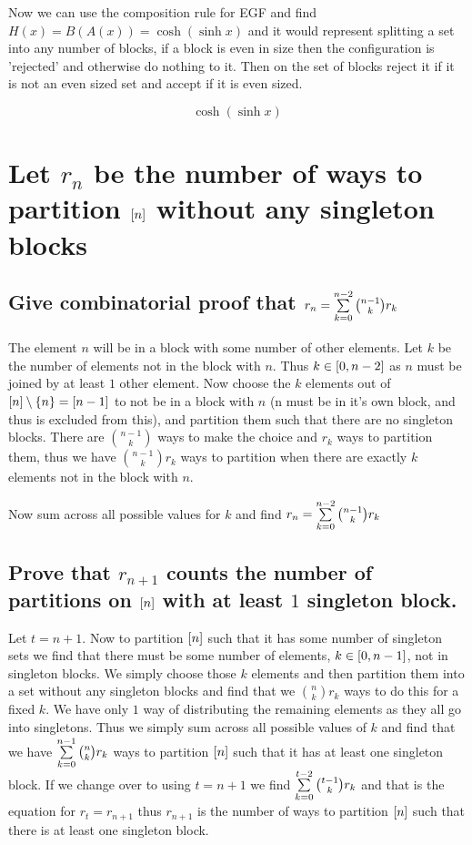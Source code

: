 \documentclass{article}
\theoremstyle{definition}
\begin{document}
Now we can use the composition rule for EGF and find $H(x) = B(A(x)) = \cosh(\sinh x)$ and it would represent splitting a set into any number of blocks, if a block is even in size then the configuration is 'rejected' and otherwise do nothing to it. Then on the set of blocks reject it if it is not an even sized set and accept if it is even sized.

\[\cosh(\sinh x)\]

\section{Let $r_n$ be the number of ways to partition $\left[ n \right]$ without any singleton blocks}
\subsection{Give combinatorial proof that $r_n=\sum\limits_{k=0}^{n-2}  {\binom{n-1}kr_k} $}

The element $n$ will be in a block with some number of other elements. Let $k$ be the number of elements not in the block with $n$. Thus $k\in\left[ {0} , {n-2} \right]$ as $n$ must be joined by at least $1$ other element. Now choose the $k$ elements out of $\left[ n \right]\setminus \left\{ {n} \right\} = \left[ n-1 \right]$ to not be in a block with $n$ (n must be in it's own block, and thus is excluded from this), and partition them such that there are no singleton blocks. There are $\binom{n-1}k$ ways to make the choice and $r_k$ ways to partition them, thus we have $\binom{n-1}kr_k$ ways to partition when there are exactly $k$ elements not in the block with $n$.

Now sum across all possible values for $k$ and find $r_n=\sum\limits_{k=0}^{n-2}  {\binom{n-1}{k}r_k} $

\subsection{Prove that $r_{n+1}$ counts the number of partitions on $\left[ n \right]$ with at least $1$ singleton block.}
Let $t=n+1$. Now to partition $\left[ n \right]$ such that it has some number of singleton sets we find that there must be some number of elements, $k \in \left[ {0} , {n-1} \right]$, not in singleton blocks. We simply choose those $k$ elements and then partition them into a set without any singleton blocks and find that we $\binom nkr_k$ ways to do this for a fixed $k$. We have only $1$ way of distributing the remaining elements as they all go into singletons. Thus we simply sum across all possible values of $k$ and find that we have $\sum\limits_{k=0}^{n-1}  {\binom nk r_k} $ ways to partition $\left[ n \right]$ such that it has at least one singleton block. If we change over to using $t=n+1$ we find $\sum\limits_{k=0}^{t-2}  {\binom {t-1}kr_k} $ and that is the equation for $r_t = r_{n+1}$ thus $r_{n+1}$ is the number of ways to partition $\left[ n \right]$ such that there is at least one singleton block.
\end{document}
